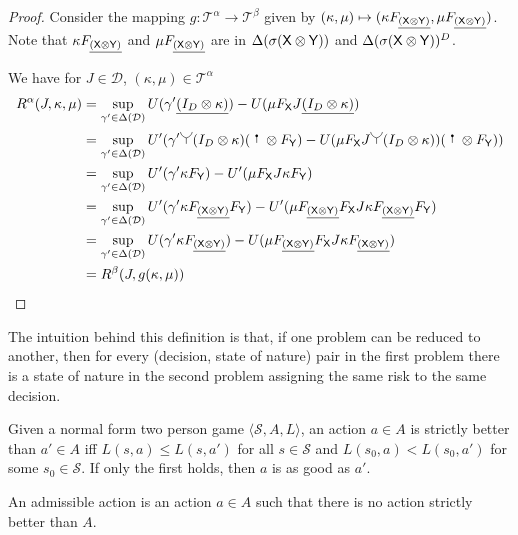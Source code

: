 \begin{proof}
Consider the mapping $g:\mathscr{T}^\alpha\to\mathscr{T}^\beta$ given by $(\kappa,\mu)\mapsto (\kappa F_{\underline{(\mathsf{X}\otimes\mathsf{Y})}},\mu F_{\underline{(\mathsf{X}\otimes\mathsf{Y})}})$. Note that $\kappa F_{\underline{(\mathsf{X}\otimes\mathsf{Y})}}$ and $\mu F_{\underline{(\mathsf{X}\otimes\mathsf{Y})}}$ are in $\Delta(\sigma(\mathsf{X}\otimes\mathsf{Y}))$ and $\Delta(\sigma(\mathsf{X}\otimes\mathsf{Y}))^D$.

We have for $J\in \mathscr{D}$, $(\kappa,\mu)\in\mathscr{T}^\alpha$
\begin{align}
    R^\alpha(J,\kappa,\mu) &= \sup_{\gamma'\in\Delta(\mathcal{D})} U(\gamma'\underline{(I_D\otimes\kappa)}) - U(\mu F_{\RV{X}} J\underline{(I_D\otimes\kappa)})\\
                           &= \sup_{\gamma'\in\Delta(\mathcal{D})} U'(\gamma'\splitter{0.15}(I_D\otimes\kappa)(\stopper{0.15}\otimes F_{\RV{Y}}) - U(\mu F_{\RV{X}} J\splitter{0.15} (I_D\otimes\kappa))(\stopper{0.15}\otimes F_{\RV{Y}}))\\
                           &= \sup_{\gamma'\in\Delta(\mathcal{D})} U'(\gamma'\kappa F_{\RV{Y}}) - U'(\mu F_{\RV{X}} J\kappa F_{\RV{Y}})\\
                           &= \sup_{\gamma'\in\Delta(\mathcal{D})} U'(\gamma'\kappa F_{\underline{(\RV{X}\otimes\RV{Y})}} F_{\RV{Y}}) - U'(\mu F_{\underline{(\RV{X}\otimes\RV{Y})}} F_{\RV{X}} J\kappa F_{\underline{(\RV{X}\otimes\RV{Y})}} F_{\RV{Y}})\\
                           &= \sup_{\gamma'\in\Delta(\mathcal{D})} U(\gamma'\kappa F_{\underline{(\RV{X}\otimes\RV{Y})}}) - U(\mu F_{\underline{(\RV{X}\otimes\RV{Y})}} F_{\RV{X}} J\kappa F_{\underline{(\RV{X}\otimes\RV{Y})}})\\
                           &= R^\beta (J,g(\kappa,\mu))
\end{align}
\end{proof}

The intuition behind this definition is that, if one problem can be reduced to another, then for every (decision, state of nature) pair in the first problem there is a state of nature in the second problem assigning the same risk to the same decision.

\begin{definition}
Given a normal form two person game $\langle \mathscr{S}, A, L\rangle$, an action $a\in A$ is strictly better than $a'\in A$ iff $L(s,a)\leq L(s,a')$ for all $s\in\mathscr{S}$ and $L(s_0,a)<L(s_0,a')$ for some $s_0\in \mathscr{S}$. If only the first holds, then $a$ is as good as $a'$.

An admissible action is an action $a\in A$ such that there is no action strictly better than $A$.
\end{definition}

